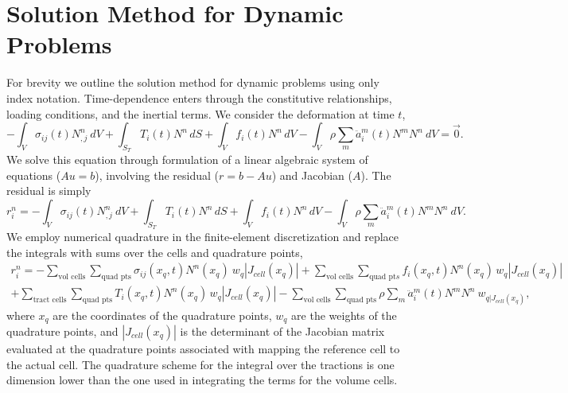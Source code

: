 \section{Solution Method for Dynamic Problems}

For brevity we outline the solution method for dynamic problems using
only index notation. Time-dependence enters through the constitutive
relationships, loading conditions, and the inertial terms. We consider
the deformation at time $t$,
\begin{equation}
-\int_{V}\sigma_{ij}(t)N_{,j}^{n}\: dV+\int_{S_{T}}T_{i}(t)N^{n}\, dS+\int_{V}f_{i}(t)N^{n}\, dV-\int_{V}\rho\sum_{m}\ddot{a}_{i}^{m}(t)N^{m}N^{n}\ dV=\vec{0}.\label{eq:elasticity:integral:dynamic:t}
\end{equation}
We solve this equation through formulation of a linear algebraic system
of equations ($Au=b$), involving the residual ($r=b-Au$) and Jacobian
($A$). The residual is simply
\begin{equation}
r_{i}^{n}=-\int_{V}\sigma_{ij}(t)N_{,j}^{n}\: dV+\int_{S_{T}}T_{i}(t)N^{n}\, dS+\int_{V}f_{i}(t)N^{n}\, dV-\int_{V}\rho\sum_{m}\ddot{a}_{i}^{m}(t)N^{m}N^{n}\ dV.
\end{equation}
We employ numerical quadrature in the finite-element discretization
and replace the integrals with sums over the cells and quadrature
points,
\begin{multline}
r_{i}^{n}=-\sum_{\text{vol cells}}\sum_{\text{quad pts}}\sigma_{ij}(x_{q},t)N^{n}(x_{q})\: w_{q}|J_{cell}(x_{q})|+\sum_{\text{vol cells}}\sum_{\text{quad pt}s}f_{i}(x_{q},t)N^{n}(x_{q})\, w_{q}|J_{cell}(x_{q})|\\
+\sum_{\text{tract cells}}\sum_{\text{quad pts}}T_{i}(x_{q},t)N^{n}(x_{q})\, w_{q}|J_{cell}(x_{q})|-\sum_{\text{vol cells}}\sum_{\text{quad pts}}\rho\sum_{m}\ddot{a}_{i}^{m}(t)N^{m}N^{n}\ w_{q|J_{cell}(x_{q})},
\end{multline}
where $x_{q}$ are the coordinates of the quadrature points, $w_{q}$
are the weights of the quadrature points, and $|J_{cell}(x_{q})|$
is the determinant of the Jacobian matrix evaluated at the quadrature
points associated with mapping the reference cell to the actual cell.
The quadrature scheme for the integral over the tractions is one dimension
lower than the one used in integrating the terms for the volume cells. 

